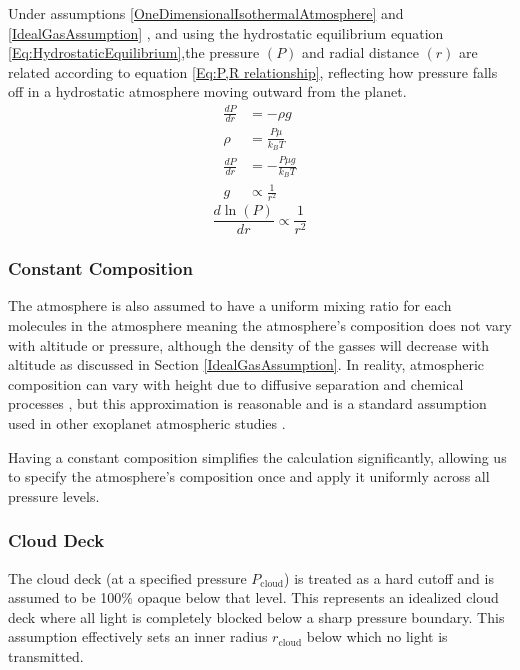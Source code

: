 \documentclass{article}
\begin{document}
Under assumptions \ref{OneDimensionalIsothermalAtmosphere} and \ref{IdealGasAssumption} , and using the hydrostatic equilibrium equation \ref{Eq:HydrostaticEquilibrium},the pressure $(P)$ and radial distance $(r)$ are related according to equation \ref{Eq:P,R relationship}, reflecting how pressure falls off in a hydrostatic atmosphere moving outward from the planet.
\begin{equation}
	\begin{split}
	\frac{dP}{dr} &= -\rho g \\
	\rho &= \frac{P \mu}{k_B T} \\
	\frac{dP}{dr} &= -\frac{P \mu g}{k_B T} \\
	g &\propto \frac{1}{r^2}
	\end{split}
	\label{Eq:HydrostaticEquilibrium}
\end{equation}
\begin{equation}
	\frac{d \ln(P)}{dr} \propto \frac{1}{r^2}
	\label{Eq:P,R relationship}
\end{equation}

\subsubsection{Constant Composition}
The atmosphere is also assumed to have a uniform mixing ratio for each molecules in the atmosphere meaning the atmosphere's composition does not vary with altitude or pressure, although the density of the gasses will decrease with altitude as discussed in Section \ref{IdealGasAssumption}.
In reality, atmospheric composition can vary with height due to diffusive separation and chemical processes \cite{Moses2011-nq}, but this approximation is reasonable and is a standard assumption used in other exoplanet atmospheric studies \cite{Madhusudhan2009-ir}.

Having a constant composition simplifies the calculation significantly, allowing us to specify the atmosphere's composition once and apply it uniformly across all pressure levels.

\subsubsection{Cloud Deck}
The cloud deck (at a specified pressure $P_\mathrm{cloud}$) is treated as a hard cutoff and is assumed to be 100\% opaque below that level. 
This represents an idealized cloud deck where all light is completely blocked below a sharp pressure boundary. 
This assumption effectively sets an inner radius $r_\mathrm{cloud}$ below which no light is transmitted.
\end{document}

